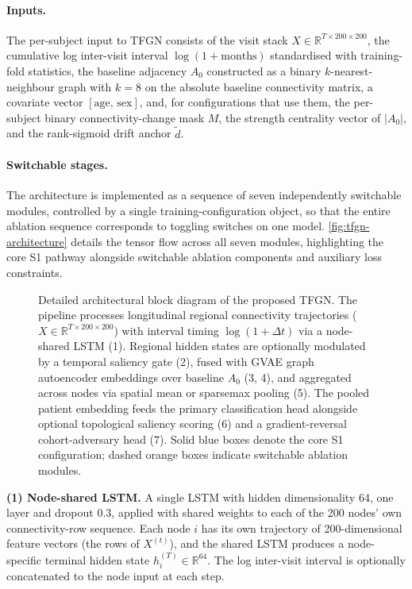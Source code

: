 \paragraph{Inputs.}
The per-subject input to \ac{TFGN} consists of the visit stack
$X \in \mathbb{R}^{T \times 200 \times 200}$, the cumulative log inter-visit interval
$\log(1 + \text{months})$ standardised with training-fold statistics, the baseline
adjacency $A_0$ constructed as a binary $k$-nearest-neighbour graph with $k = 8$ on the
absolute baseline connectivity matrix, a covariate vector $[\text{age},\, \text{sex}]$,
and, for configurations that use them, the per-subject binary connectivity-change mask $M$, the
strength centrality vector of $|A_0|$, and the rank-sigmoid drift anchor $\tilde{d}$.

\paragraph{Switchable stages.}
The architecture is implemented as a sequence of seven independently switchable modules,
controlled by a single training-configuration object, so that the entire ablation
sequence corresponds to toggling switches on one model. \autoref{fig:tfgn-architecture} details the tensor flow across all seven modules, highlighting the core S1 pathway alongside switchable ablation components and auxiliary loss constraints.

\begin{figure}
  \centering
  \resizebox{0.92\linewidth}{!}{}
  \caption{Detailed architectural block diagram of the proposed \ac{TFGN}. The pipeline processes longitudinal regional connectivity trajectories ($X \in \mathbb{R}^{T \times 200 \times 200}$) with interval timing $\log(1+\Delta t)$ via a node-shared \ac{LSTM} (1). Regional hidden states are optionally modulated by a temporal saliency gate (2), fused with \ac{GVAE} graph autoencoder embeddings over baseline $A_0$ (3, 4), and aggregated across nodes via spatial mean or sparsemax pooling (5). The pooled patient embedding feeds the primary classification head alongside optional topological saliency scoring (6) and a gradient-reversal cohort-adversary head (7). Solid blue boxes denote the core S1 configuration; dashed orange boxes indicate switchable ablation modules.}
  \label{fig:tfgn-architecture}
\end{figure}

\textbf{(1) Node-shared LSTM.} A single \ac{LSTM} with hidden dimensionality 64, one
layer and dropout 0.3, applied with shared weights to each of the 200 nodes' own
connectivity-row sequence. Each node $i$ has its own trajectory of 200-dimensional
feature vectors (the rows of $X^{(t)}$), and the shared \ac{LSTM} produces a
node-specific terminal hidden state $h_i^{(T)} \in \mathbb{R}^{64}$. The log
inter-visit interval is optionally concatenated to the node input at each step.

